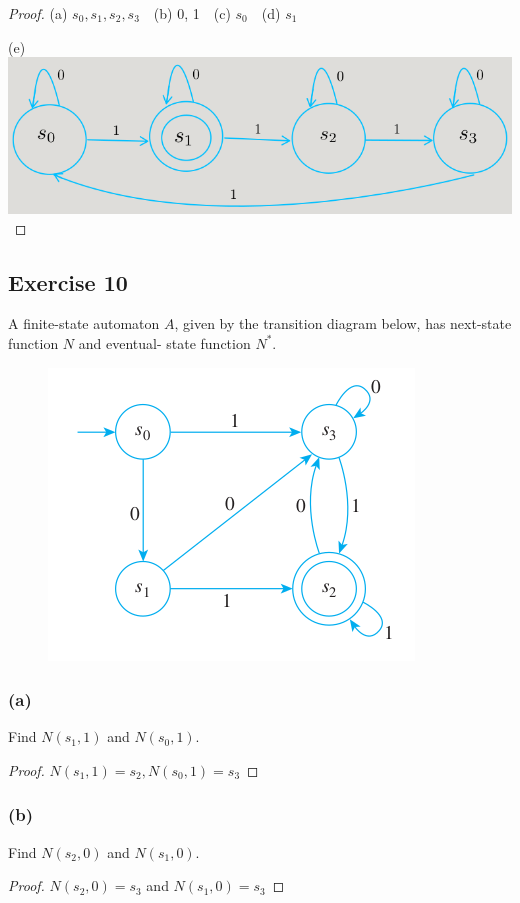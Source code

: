 \documentclass[14pt]{extarticle}
\begin{document}
\begin{proof}
    (a) \(s_0, s_1, s_2, s_3\) \,\, (b) 0, 1 \,\, (c) \(s_0\) \,\, (d) \(s_1\) \,\,

    (e) \includegraphics[scale=0.4]{../images/12.2.9.e.png}
\end{proof}

\subsection{Exercise 10}
A finite-state automaton \(A\), given by the transition diagram below, has next-state function \(N\) and eventual-
state function \(N^*\).

\begin{figure}[ht!]
    \centering
    \includegraphics[scale=0.5]{../images/12.2.10.png}
\end{figure}

\subsubsection{(a)}
Find \(N(s_1, 1)\) and \(N(s_0, 1)\).
\begin{proof}
    \(N(s_1, 1) = s_2, N(s_0, 1) = s_3\)
\end{proof}

\subsubsection{(b)}
Find \(N(s_2, 0)\) and \(N(s_1, 0)\).
\begin{proof}
    \(N(s_2, 0) = s_3\) and \(N(s_1, 0) = s_3\)
\end{proof}
\end{document}
